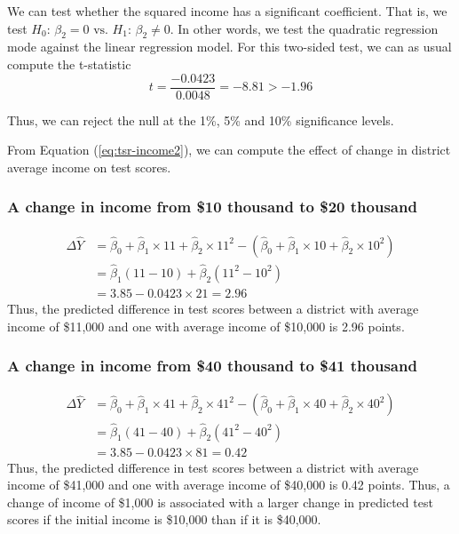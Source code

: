 \documentclass[a4paper,11pt]{article}
\begin{document}
We can test whether the squared income has a significant
coefficient. That is, we test \(H_0:\, \beta_2 = 0 \text{ vs. } H_1:\,
\beta_2 \neq 0\). In other words, we test the quadratic regression mode
against the linear regression model. For this two-sided test, we can
as usual compute the t-statistic
\[ t = \frac{-0.0423}{0.0048} = -8.81 > -1.96 \]

Thus, we can reject the null at the 1\%, 5\% and 10\% significance levels.

From Equation (\ref{eq:tsr-income2}), we can compute the effect of
change in district average income on test scores.

\subsubsection*{A change in income from \$10 thousand to \$20 thousand}
\label{sec:org97e2cf1}
\begin{equation*}
\begin{split}
\Delta \hat{Y} &= \hat{\beta}_0 + \hat{\beta}_1 \times 11 + \hat{\beta}_2 \times 11^2 - (\hat{\beta}_0 + \hat{\beta}_1 \times 10 + \hat{\beta}_2 \times 10^2) \\
&= \hat{\beta}_1 (11 - 10) + \hat{\beta}_2(11^2 - 10^2) \\
& = 3.85 - 0.0423 \times 21 = 2.96
\end{split}
\end{equation*}
Thus, the predicted difference in test scores between a district with
average income of \$11,000 and one with average income of \$10,000 is
2.96 points.

\subsubsection*{A change in income from \$40 thousand to \$41 thousand}
\label{sec:org5e72359}
\begin{equation*}
\begin{split}
\Delta \hat{Y} &= \hat{\beta}_0 + \hat{\beta}_1 \times 41 + \hat{\beta}_2 \times 41^2 - (\hat{\beta}_0 + \hat{\beta}_1 \times 40 + \hat{\beta}_2 \times 40^2) \\
&= \hat{\beta}_1 (41 - 40) + \hat{\beta}_2(41^2 - 40^2) \\
& = 3.85 - 0.0423 \times 81 = 0.42
\end{split}
\end{equation*}
Thus, the predicted difference in test scores between a district with
average income of \$41,000 and one with average income of \$40,000 is
0.42 points. Thus, a change of income of \$1,000 is associated with a
larger change in predicted test scores if the initial income is
\$10,000 than if it is \$40,000.
\end{document}
